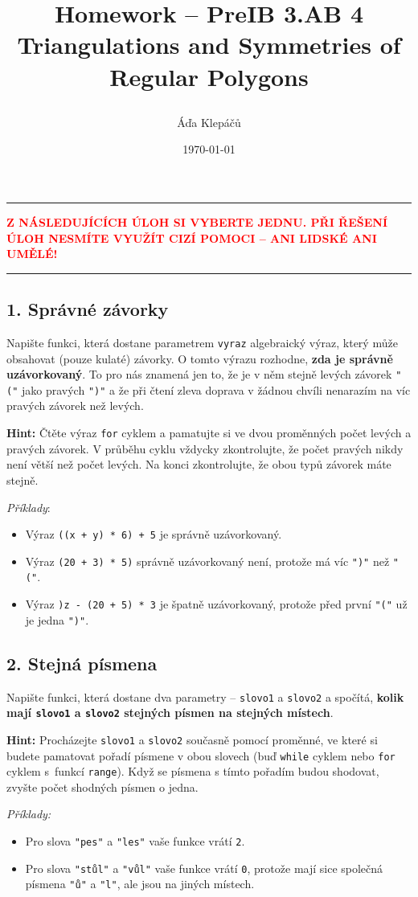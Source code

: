 \documentclass[a4paper,11pt]{article}
\title{\Huge\textsf{Homework -- PreIB 3.AB 4}\\
 \Large\textsf{Triangulations and Symmetries of Regular Polygons}
 \author{Áďa Klepáčů}
 \date{\today}
}
\newcommand{\clr}{\textcolor{red}}
\begin{document}
\thispagestyle{fancy}

\hrule
\vspace*{-1em}
\begin{center}
 \clr{\textbf{Z NÁSLEDUJÍCÍCH ÚLOH SI VYBERTE JEDNU. PŘI ŘEŠENÍ ÚLOH 
  NESMÍTE VYUŽÍT CIZÍ POMOCI -- ANI LIDSKÉ ANI UMĚLÉ!}}
\end{center}
\hrule

\subsection*{1. Správné závorky}

Napište funkci, která dostane parametrem \texttt{vyraz} algebraický výraz, který
může obsahovat (pouze kulaté) závorky. O tomto výrazu rozhodne, \textbf{zda je
správně uzávorkovaný}. To pro nás znamená jen to, že je v něm stejně levých
závorek \texttt{"("} jako pravých \texttt{")"} a že při čtení zleva doprava v
žádnou chvíli nenarazím na víc pravých závorek než levých.

\textbf{Hint:} Čtěte výraz \texttt{for} cyklem a pamatujte si ve dvou proměnných
počet levých a pravých závorek. V průběhu cyklu vždycky zkontrolujte, že počet
pravých nikdy není větší než počet levých. Na konci zkontrolujte, že obou typů
závorek máte stejně.

\emph{Příklady}:
\begin{itemize}
 \item Výraz \texttt{((x + y) * 6) + 5} je správně uzávorkovaný.
 \item Výraz \texttt{(20 + 3) * 5)} správně uzávorkovaný není, protože má víc
  \texttt{")"} než \texttt{"("}.
 \item Výraz \texttt{)z - (20 + 5) * 3} je špatně uzávorkovaný, protože před
  první \texttt{"("} už je jedna \texttt{")"}.
\end{itemize}

\clearpage

\subsection*{2. Stejná písmena}

Napište funkci, která dostane dva parametry -- \texttt{slovo1} a \texttt{slovo2}
a spočítá, \textbf{kolik mají \texttt{slovo1} a \texttt{slovo2} stejných písmen
na stejných místech}.

\textbf{Hint:} Procházejte \texttt{slovo1} a \texttt{slovo2} současně pomocí
proměnné, ve které si budete pamatovat pořadí písmene v obou slovech (buď
\texttt{while} cyklem nebo \texttt{for} cyklem s~funkcí \texttt{range}). Když se
písmena s tímto pořadím budou shodovat, zvyšte počet shodných písmen o jedna.

\emph{Příklady:}
\begin{itemize}
 \item Pro slova \texttt{"pes"} a \texttt{"les"} vaše funkce vrátí \texttt{2}.
 \item Pro slova \texttt{"stůl"} a \texttt{"vůl"} vaše funkce vrátí \texttt{0},
  protože mají sice společná písmena \texttt{"ů"} a \texttt{"l"}, ale jsou na
  jiných místech.
\end{itemize}
\end{document}
